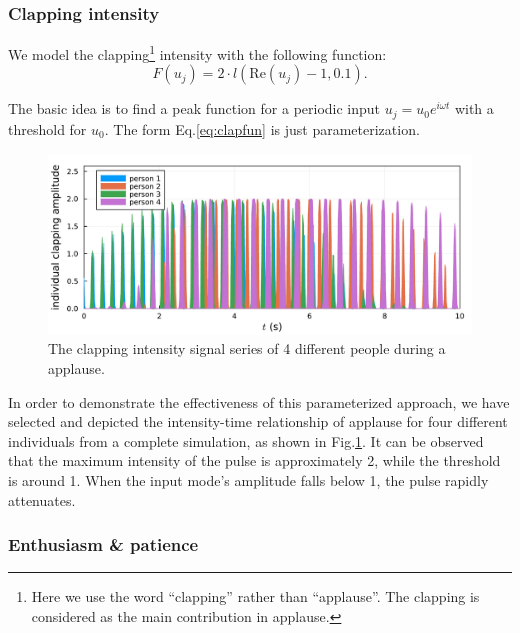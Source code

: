 \documentclass[UTF8,a4paper,11pt]{ctexart}
\begin{document}
\subsubsection{Clapping intensity}

We model the clapping\footnote{Here we use the word ``clapping'' rather than ``applause''. The clapping is considered as the main contribution in applause.} intensity with the following function:
\begin{equation}
    F(u_j) = 2 ⋅ l(\mathrm{Re}(u_j)-1,0.1).
    \label{eq:clapfun}
\end{equation}

The basic idea is to find a peak function for a periodic input $u_j = u_0 e^{iωt}$ with a threshold for $u_0$. The form Eq.\ref{eq:clapfun} is just parameterization.

\begin{figure}[H]
    \centering
    \includegraphics[scale=0.6]{individualclap.pdf}
    \caption{The clapping intensity signal series of 4 different people during a applause.}
    \label{fig:ind_clap}
\end{figure}

In order to demonstrate the effectiveness of this parameterized approach, we have selected and depicted the intensity-time relationship of applause for four different individuals from a complete simulation, as shown in Fig.\ref{fig:ind_clap}. It can be observed that the maximum intensity of the pulse is approximately 2, while the threshold is around 1. When the input mode's amplitude falls below 1, the pulse rapidly attenuates.

\subsubsection{Enthusiasm \& patience}
\end{document}
